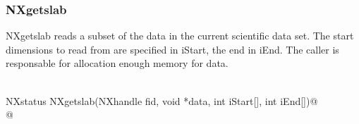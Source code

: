 \documentclass[12pt]{article}
\begin{document}
\subsubsection{NXgetslab}
NXgetslab reads a subset of the data in the current scientific data set.
The start dimensions to read from are specified in iStart, the end in iEnd.
The caller is responsable for allocation enough memory for data.
\begin{flushleft} \small
\begin{minipage}{\linewidth} \label{scrap14}
\vspace{-1ex}
\begin{list}{}{} \item
\mbox{}\verb@@\\
\mbox{}\verb@   NXstatus NXgetslab(NXhandle fid, void *data, int iStart[], int iEnd[])@\\
\mbox{}@\\
\end{list}
\vspace{-1ex}
\footnotesize\addtolength{\baselineskip}{-1ex}
\end{minipage}\\[4ex]
\end{flushleft}
\end{document}
